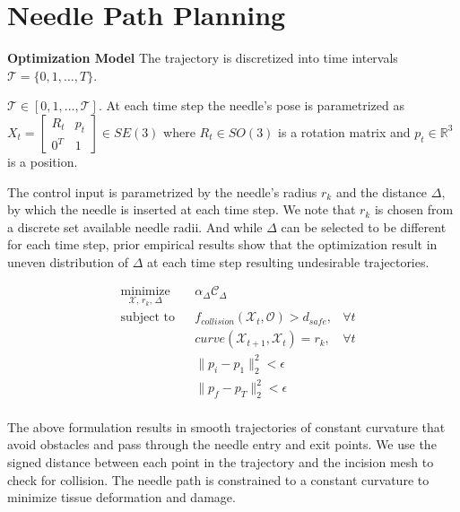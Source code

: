 \section{Needle Path Planning}
\noindent \textbf{Optimization Model}
The trajectory is discretized into time intervals $\mathcal{T} = \{0,1,\ldots,T\}$.



$\mathcal{T} \in [0, 1, \ldots, \mathcal{T}]$.
At each time step the needle's pose is parametrized as
$X_t = \begin{bmatrix}
    R_t & p_t \\ 0^T & 1
\end{bmatrix} \in SE(3)$
where $R_t \in SO(3)$ is a rotation matrix and 
$ p_t \in  \mathbb{R}^3 $ is a position.

The control input is parametrized by the needle's radius $r_k$ and the distance $\Delta$, by which the needle is inserted at each time step. We note that $r_k$ is chosen from a discrete set available needle radii. And while $\Delta$ can be selected to be different for each time step, prior empirical results show that the optimization result in uneven distribution of $\Delta$ at each time step resulting undesirable trajectories. 

\begin{equation*}
\begin{aligned}
& \underset{\mathcal{X},\, r_k,\, \Delta}{\text{minimize}}
& & \alpha_\Delta \mathcal{C}_\Delta \\
& \text{subject to}
& & f_{collision}(\mathcal{X}_t, \mathcal{O}) > d_{safe}, & \forall t  \\
& & & curve(\mathcal{X}_{t+1}, \mathcal{X}_t) = r_k, & \forall t  \\
& & & \|p_i-p_1\|_2^2 < \epsilon \\
& & & \|p_f-p_T\|_2^2 < \epsilon \\
\end{aligned}
\end{equation*}

The above formulation results in smooth trajectories of constant curvature that
avoid obstacles and pass through the needle entry and exit points. We use the
signed distance between each point in the trajectory and the incision mesh to
check for collision. The needle path is constrained to a constant curvature to
minimize tissue deformation and damage.

